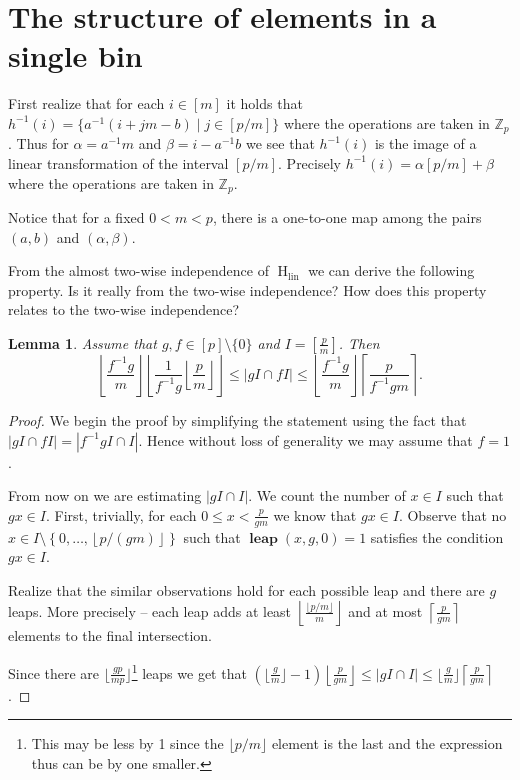 \documentclass{article}
\newcommand{\hlin}{\operatorname{H}_{\operatorname{lin}}}
\newcommand{\leap}[3]{\operatorname{\mathbf{leap}}({#1}, {#2}, {#3})}
\newtheorem{lemma}{Lemma}
\begin{document}
\section{The structure of elements in a single bin}

First realize that for each $i \in [m]$ it holds that $h^{-1}(i) = \{a^{-1} (i + j m - b) \mid j \in [p / m]\}$ where the operations are taken in $\mathbb{Z}_p$.
Thus for $\alpha = a^{-1}m$ and $\beta = i-a^{-1}b$ we see that $h^{-1}(i)$ is the image of a linear transformation of the interval $[p / m]$. Precisely $h^{-1}(i) = \alpha [p/m] + \beta$ where the operations are taken in $\mathbb{Z}_p$.

Notice that for a fixed $0 < m < p$, there is a one-to-one map among the pairs $(a, b)$ and $(\alpha, \beta)$.

From the almost two-wise independence of $\hlin$ we can derive the following property. {\color{red} Is it really from the two-wise independence? How does this property relates to the two-wise independence?}

\begin{lemma}
Assume that $g, f \in [p] \setminus \{0\}$ and $I = \left[\frac{p}{m}\right]$. Then \[\left\lfloor \frac{f^{-1}g}{m} \right\rfloor \left\lfloor \frac{1}{f^{-1}g} \left\lfloor\frac{p}{m}\right\rfloor \right\rfloor \leq |gI \cap fI| \leq \left\lfloor \frac{f^{-1}g}{m} \right\rfloor \left\lceil \frac{p}{f^{-1}gm} \right\rceil.\]
\end{lemma}
\begin{proof}
We begin the proof by simplifying the statement using the fact that $|gI \cap fI| = |f^{-1}gI \cap I|$. Hence without loss of generality we may assume that $f = 1$.

From now on we are estimating $|gI \cap I|$.
We count the number of $x \in I$ such that $gx \in I$.
First, trivially, for each $0 \leq x < \frac{p}{gm}$ we know that $gx \in I$.
Observe that no $x \in I \setminus \left\{ 0, \dots, \left\lfloor {p}/{(gm)} \right\rfloor \right\}$ such that $\leap{x}{g}{0} = 1$ satisfies the condition $gx \in I$.

Realize that the similar observations hold for each possible leap and there are $g$ leaps. More precisely -- each leap adds at least $\left\lfloor \frac{\lfloor p/m \rfloor}{m} \right\rfloor$ and at most $\left\lceil \frac{p}{gm} \right\rceil$ elements to the final intersection.

Since there are $\lfloor\frac{gp}{mp}\rfloor$\footnote{This may be less by 1 since the $\lfloor p/m \rfloor$ element is the last and the expression thus can be by one smaller.} leaps we get that $\left(\lfloor\frac{g}{m}\rfloor - 1\right) \left\lfloor \frac{p}{gm} \right\rfloor \leq |gI \cap I| \leq \lfloor \frac{g}{m}\rfloor\left\lceil \frac{p}{gm} \right\rceil$.
\end{proof}
\end{document}
